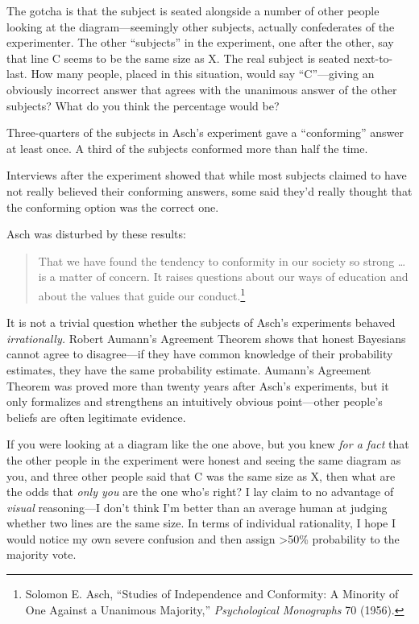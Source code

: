{
 The gotcha is that the subject is seated alongside a number of
other people looking at the diagram---seemingly other subjects,
actually confederates of the experimenter. The other
``subjects'' in the experiment, one
after the other, say that line C seems to be the same size as X. The
real subject is seated next-to-last. How many people, placed in this
situation, would say ``C''---giving
an obviously incorrect answer that agrees with the unanimous answer of
the other subjects? What do you think the percentage would be?}

{
 Three-quarters of the subjects in Asch's
experiment gave a ``conforming''
answer at least once. A third of the subjects conformed more than half
the time.}

{
 Interviews after the experiment showed that while most subjects
claimed to have not really believed their conforming answers, some said
they'd really thought that the conforming option was
the correct one.}

{
 Asch was disturbed by these results:}

\begin{quote}
{
 That we have found the tendency to conformity in our society so
strong \ldots is a matter of concern. It raises questions about our ways
of education and about the values that guide our
conduct.\footnote{Solomon E. Asch, ``Studies of Independence and
Conformity: A Minority of One Against a Unanimous
Majority,'' \textit{Psychological Monographs} 70
(1956).}}
\end{quote}

{
 It is not a trivial question whether the subjects of
Asch's experiments behaved \textit{irrationally.}
Robert Aumann's Agreement Theorem shows that honest
Bayesians cannot agree to disagree---if they have common knowledge of
their probability estimates, they have the same probability estimate.
Aumann's Agreement Theorem was proved more than twenty
years after Asch's experiments, but it only formalizes
and strengthens an intuitively obvious point---other
people's beliefs are often legitimate evidence.}

{
 If you were looking at a diagram like the one above, but you knew
\textit{for a fact} that the other people in the experiment were honest
and seeing the same diagram as you, and three other people said that C
was the same size as X, then what are the odds that \textit{only you}
are the one who's right? I lay claim to no advantage of
\textit{visual} reasoning---I don't think
I'm better than an average human at judging whether two
lines are the same size. In terms of individual rationality, I hope I
would notice my own severe confusion and then assign {\textgreater}50\%
probability to the majority vote.}

